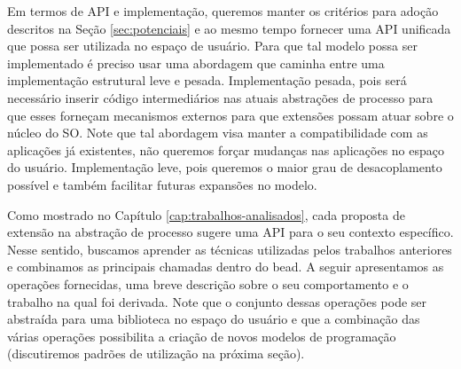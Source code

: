 Em termos de API e implementação, queremos manter os critérios para adoção
descritos na Seção \ref{sec:potenciais} e ao mesmo tempo fornecer uma API
unificada que possa ser utilizada no espaço de usuário. Para que tal modelo
possa ser implementado é preciso usar uma abordagem que caminha entre uma
implementação estrutural leve e pesada. Implementação pesada, pois será
necessário inserir código intermediários nas atuais abstrações de processo para
que esses forneçam mecanismos externos para que extensões possam atuar sobre o
núcleo do SO.  Note que tal abordagem visa manter a compatibilidade com as
aplicações já existentes, não queremos forçar mudanças nas aplicações no espaço
do usuário. Implementação leve, pois queremos o maior grau de desacoplamento
possível e também facilitar futuras expansões no modelo.

Como mostrado no Capítulo \ref{cap:trabalhos-analisados}, cada proposta de
extensão na abstração de processo sugere uma API para o seu contexto
específico. Nesse sentido, buscamos aprender as técnicas utilizadas pelos
trabalhos anteriores e combinamos as principais chamadas dentro do bead. A
seguir apresentamos as operações fornecidas, uma breve descrição sobre o seu
comportamento  e o trabalho na qual foi derivada.  Note que o conjunto dessas
operações pode ser abstraída para uma biblioteca no espaço do usuário e que a
combinação das várias operações possibilita a criação de novos modelos de
programação (discutiremos padrões de utilização na próxima seção). 

